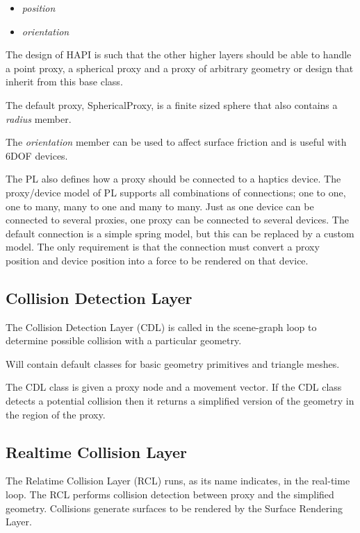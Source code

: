 \begin{itemize}
\item {\it position}
\item {\it orientation}
\end{itemize}

The design of HAPI is such that the other higher layers should be able
to handle a point proxy, a spherical proxy and a proxy of arbitrary
geometry or design that inherit from this base class.

The default proxy, SphericalProxy, is a finite sized sphere that also
contains a {\it radius} member.

The {\it orientation} member can be used to affect surface friction
and is useful with 6DOF devices.

The PL also defines how a proxy should be connected to a haptics
device. The proxy/device model of PL supports all combinations of
connections; one to one, one to many, many to one and many to
many. Just as one device can be connected to several proxies, one
proxy can be connected to several devices. The default connection is a
simple spring model, but this can be replaced by a custom model. The
only requirement is that the connection must convert a proxy position
and device position into a force to be rendered on that device.


\subsection{Collision Detection Layer}
The Collision Detection Layer (CDL) is called in the scene-graph loop
to determine possible collision with a particular geometry.

Will contain default classes for basic geometry primitives and
triangle meshes.

The CDL class is given a proxy node and a movement vector. If the CDL
class detects a potential collision then it returns a simplified
version of the geometry in the region of the proxy.


\subsection{Realtime Collision Layer}

The Relatime Collision Layer (RCL) runs, as its name indicates, in the
real-time loop. The RCL performs collision detection between proxy and
the simplified geometry. Collisions generate surfaces to be rendered
by the Surface Rendering Layer.


